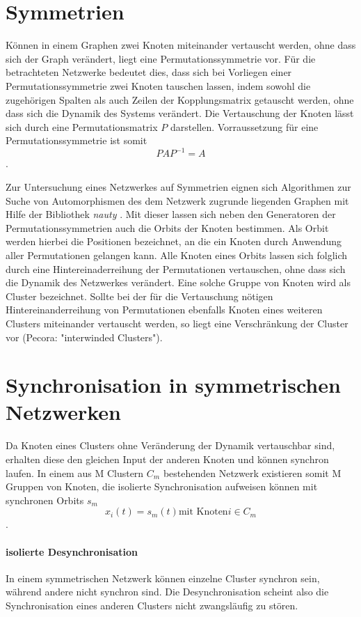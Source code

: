 \section{Symmetrien}
Können in einem Graphen zwei Knoten miteinander vertauscht werden, ohne dass sich der Graph verändert, liegt eine Permutationssymmetrie vor. Für die betrachteten Netzwerke bedeutet dies, dass sich bei Vorliegen einer Permutationssymmetrie zwei Knoten tauschen lassen, indem sowohl die zugehörigen Spalten als auch Zeilen der Kopplungsmatrix getauscht werden, ohne dass sich die Dynamik des Systems verändert. Die Vertauschung der Knoten lässt sich durch eine Permutationsmatrix $P$ darstellen. Vorraussetzung für eine Permutationssymmetrie ist somit
\begin{equation}
PAP^{-1}=A
\end{equation}.

Zur Untersuchung eines Netzwerkes auf Symmetrien eignen sich Algorithmen zur Suche von Automorphismen des dem Netzwerk zugrunde liegenden Graphen mit Hilfe der Bibliothek \textit{nauty} \cite{nauty}. Mit dieser lassen sich neben den Generatoren der Permutationssymmetrien auch die Orbits der Knoten bestimmen. Als Orbit werden hierbei die Positionen bezeichnet, an die ein Knoten durch Anwendung aller Permutationen gelangen kann. Alle Knoten eines Orbits lassen sich folglich durch eine Hintereinaderreihung der Permutationen vertauschen, ohne dass sich die Dynamik des Netzwerkes verändert. Eine solche Gruppe von Knoten wird als Cluster bezeichnet. Sollte bei der für die Vertauschung nötigen Hintereinanderreihung von Permutationen ebenfalls Knoten eines weiteren Clusters miteinander vertauscht werden, so liegt eine Verschränkung der Cluster vor (Pecora: "interwinded Clusters").

\section{Synchronisation in symmetrischen Netzwerken}
Da Knoten eines Clusters ohne Veränderung der Dynamik vertauschbar sind, erhalten diese den gleichen Input der anderen Knoten und können synchron laufen. In einem aus M Clustern $C_m$ bestehenden Netzwerk existieren somit M Gruppen von Knoten, die isolierte Synchronisation aufweisen können mit synchronen Orbits $s_m$
\begin{equation}
x_i(t)=s_m(t) \text{mit Knoten} i\in C_m
\end{equation}.

\paragraph{isolierte Desynchronisation}
In einem symmetrischen Netzwerk können einzelne Cluster synchron sein, während andere nicht synchron sind. Die Desynchronisation scheint also die Synchronisation eines anderen Clusters nicht zwangsläufig zu stören.

